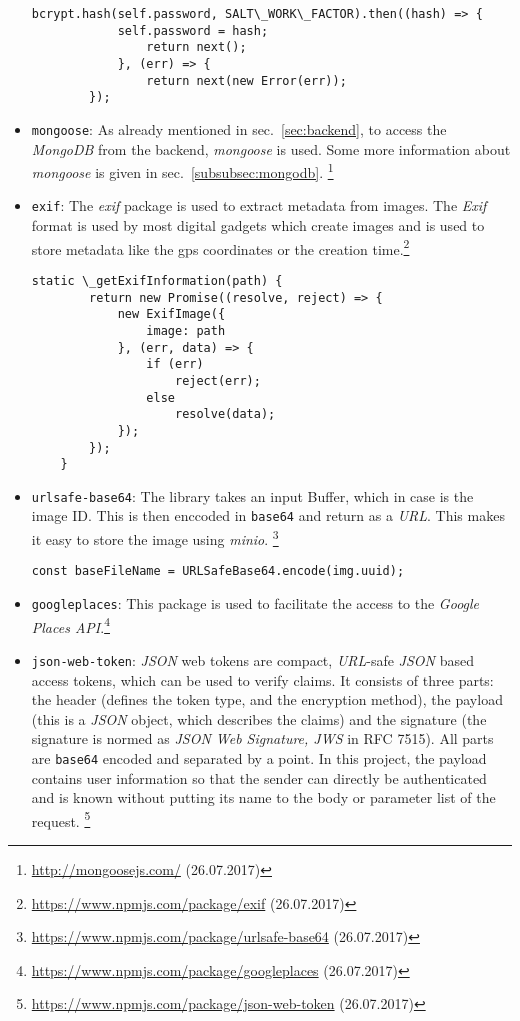 \begin{itemize}
\begin{lstlisting}[caption={\textit{bcrypt} for hashing the users password.}, label=lst:bcrypt]
		bcrypt.hash(self.password, SALT\_WORK\_FACTOR).then((hash) => {
			self.password = hash;
				return next();
			}, (err) => {
				return next(new Error(err));
		});
	\end{lstlisting}
	\item \texttt{mongoose}: As already mentioned in sec.\ \ref{sec:backend}, to access the \textit{MongoDB} from the backend, \textit{mongoose} is used. Some more information about \textit{mongoose} is given in sec.\ \ref{subsubsec:mongodb}. 
	\footnote{\url{http://mongoosejs.com/} (26.07.2017)}
	\item \texttt{exif}: The \textit{exif} package is used to extract metadata from images. The \textit{Exif} format is used by most digital gadgets which create images and is used to store metadata like the gps coordinates or the creation time.\footnote{\url{https://www.npmjs.com/package/exif} (26.07.2017)}
	\begin{lstlisting}[caption={Extraction of \textit{Exif} metadata from an image.}, label=lst:exif]
	static \_getExifInformation(path) {
		return new Promise((resolve, reject) => {
			new ExifImage({
				image: path
			}, (err, data) => {
				if (err)
					reject(err);
				else
					resolve(data);
			});
		});
	}
	\end{lstlisting}	
	\item \texttt{urlsafe-base64}: The library takes an input Buffer, which in case is the image ID. This is then enccoded in \texttt{base64} and return as a \textit{URL}. This makes it easy to store the image using \textit{minio}.
	\footnote{\url{https://www.npmjs.com/package/urlsafe-base64} (26.07.2017)}
	\begin{lstlisting}[caption={This package enables encoding an ID created with \texttt{uuid} in \texttt{base64} as a \textit{URL}. This name then can further be used to save the image with \texttt{minio}.}, label=lst:urlsafe-base64]
	const baseFileName = URLSafeBase64.encode(img.uuid);
	\end{lstlisting}
	\item \texttt{googleplaces}: This package is used to facilitate the access to the \textit{Google Places API}.\footnote{\url{https://www.npmjs.com/package/googleplaces} (26.07.2017)}
	\item \texttt{json-web-token}: \textit{JSON} web tokens are compact, \textit{URL}-safe \textit{JSON} based access tokens, which can be used to verify claims. It consists of three parts: the header (defines the token type, and the encryption method), the payload (this is a \textit{JSON} object, which describes the claims) and the signature (the signature is normed as \textit{JSON Web Signature, JWS} in RFC 7515). All parts are \texttt{base64} encoded and separated by a point. In this project, the payload contains user information so that the sender can directly be authenticated and is known without putting its name to the body or parameter list of the request.	\footnote{\url{https://www.npmjs.com/package/json-web-token} (26.07.2017)}

\end{itemize}
